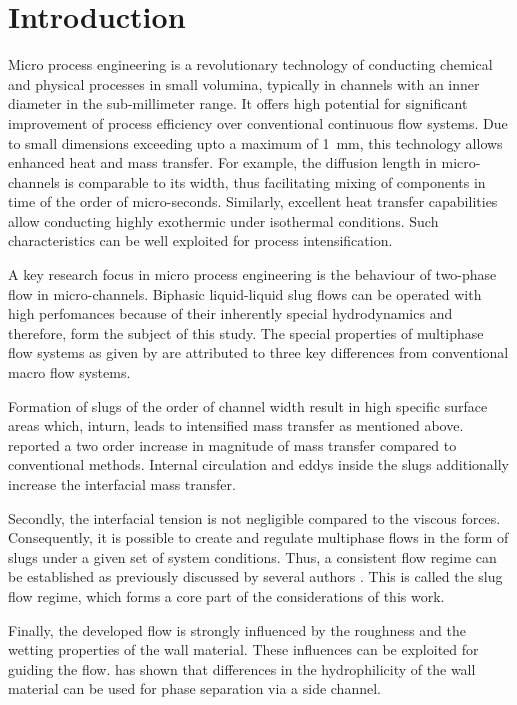 \documentclass[main.tex]{subfiles}
\begin{document}
\chapter[Introduction]{Introduction}
Micro process engineering is a revolutionary technology of conducting chemical and physical processes in small volumina, typically in channels with an inner diameter in the sub-millimeter range. It offers high potential for significant improvement of process efficiency over conventional continuous flow systems. Due to small dimensions exceeding upto a maximum of 1~mm, this technology allows enhanced heat and mass transfer. For example, the diffusion length in micro-channels is comparable to its width, thus facilitating mixing of components in time of the order of micro-seconds. Similarly, excellent heat transfer capabilities allow conducting highly exothermic under isothermal conditions. Such characteristics can be well exploited for process intensification.

A key research focus in micro process engineering is the behaviour of two-phase flow in micro-channels. Biphasic liquid-liquid slug flows can be operated with high perfomances because of their inherently special hydrodynamics  and therefore, form the subject of this study. The special properties of multiphase flow systems as given by  are attributed to three key differences from conventional macro flow systems. 

Formation of slugs of the order of channel width result in high specific surface areas which, inturn, leads to intensified mass transfer as mentioned above.  reported a two order increase in magnitude of mass transfer compared to conventional methods. Internal circulation and eddys inside the slugs additionally increase the interfacial mass transfer. 

Secondly, the interfacial tension is not negligible compared to the viscous forces. Consequently, it is possible to create and regulate multiphase flows in the form of slugs under a given set of system conditions. Thus, a consistent flow regime can be established as previously discussed by several authors . This is called the slug flow regime, which forms a core part of the considerations of this work.

Finally, the developed flow is strongly influenced by the roughness and the wetting properties of the wall material. These influences can be exploited for guiding the flow.  has shown that differences in the hydrophilicity of the wall material can be used for phase separation via a side channel. 
\end{document}
